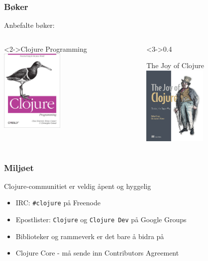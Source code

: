 \documentclass{beamer}
\begin{document}
\begin{frame}
  \frametitle{Bøker}
  Anbefalte bøker:

\begin{columns}[c]
    \begin{column}{0.4\textwidth}
      \begin{block}<2->{Clojure Programming}
        \centering
        \includegraphics[width=3cm]{img/clj-prog}
      \end{block}
    \end{column}
    \begin{column}<3->{0.4\textwidth}
      \begin{block}{The Joy of Clojure}
        \centering
        \includegraphics[width=3cm]{img/joy-of-clj}
      \end{block}
    \end{column}
  \end{columns}
\vspace{3mm}
\end{frame}

\begin{frame}
  \frametitle{Miljøet}
  Clojure-communitiet er veldig åpent og hyggelig

  \begin{itemize}
  \item<2-> IRC: {\tt \#clojure} på Freenode
  \item<3-> Epostlister: {\tt Clojure} og {\tt Clojure Dev} på Google Groups
  \item<4-> Biblioteker og rammeverk er det bare å bidra på
  \item<5-> Clojure Core - må sende inn Contributors Agreement
  \end{itemize}
\end{frame}
\end{document}
